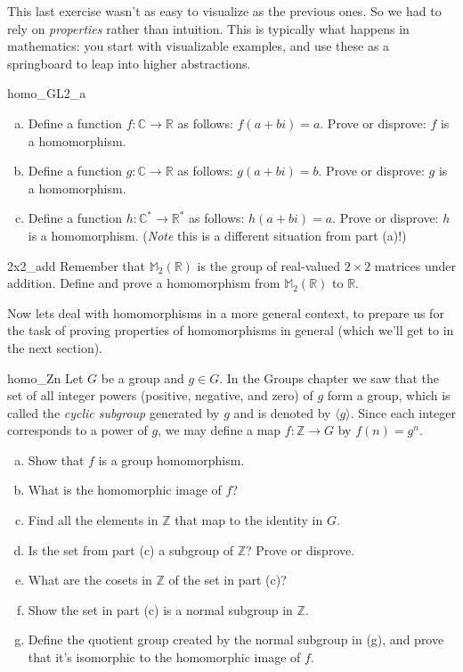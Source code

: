 \begin{rem}
This last exercise wasn't as easy to visualize as the previous ones.  So we had to rely on \emph{properties} rather than intuition. This is typically what happens in mathematics: you start with visualizable examples, and use these as a springboard to leap into higher abstractions.
\end{rem}

\begin{exercise}{homo_GL2_a}
\begin{enumerate}[(a)]
\item
Define a function $f: {\mathbb C} \rightarrow {\mathbb R }$ as follows: $f(a+bi) = a$.  Prove or disprove:  $f$ is a  homomorphism.
\item
Define a function $g: {\mathbb C} \rightarrow {\mathbb R }$ as follows: $g(a+bi) = b$.  Prove or disprove:  $g$ is a homomorphism.
\item
Define a function $h: {\mathbb C}^* \rightarrow {\mathbb R }^*$ as follows: $h(a+bi) = a$.  Prove or disprove:  $h$ is a  homomorphism. (\emph{Note} this is a different situation from part (a)!) 
\end{enumerate}
\end{exercise}

\begin{exercise}{2x2_add}
Remember that  ${\mathbb M}_2( {\mathbb R})$ is the group of real-valued $2 \times 2$ matrices under addition.  Define and prove a homomorphism from ${\mathbb M}_2( {\mathbb R})$ to ${\mathbb R}$.
\end{exercise}

Now lets deal with homomorphisms in a more general context, to prepare us for the task of proving  properties of homomorphisms in general (which we'll get to in the next section).
 
\begin{exercise}{homo_Zn}
Let $G$ be a group and $g \in G$. In the Groups chapter we saw that the set of all integer powers (positive, negative, and zero) of $g$ form a group, which is called the
\emph{cyclic subgroup} generated by $g$ and is denoted by $\langle g \rangle$. 
Since each integer corresponds to a power of $g$, we may define a map $f : {\mathbb Z}
\rightarrow G$ by $f( n ) = g^n$. 
\begin{enumerate}[(a)]
\item
Show that $f$ is a group
homomorphism.
\item 
What is the homomorphic image of $f$?
\item
Find all the elements in ${\mathbb Z}$ that map  to the identity in $G$.
\item
Is the set from part (c) a subgroup of ${\mathbb Z}$?  Prove or disprove.
\item
What are the cosets in ${\mathbb Z}$ of the set in part (c)?
\item
Show the set in part (c) is a normal subgroup in ${\mathbb Z}$.
\item
Define the quotient group created by the normal subgroup in (g), and prove that it's isomorphic to  the homomorphic image of $f$.
\end{enumerate}
\end{exercise}


